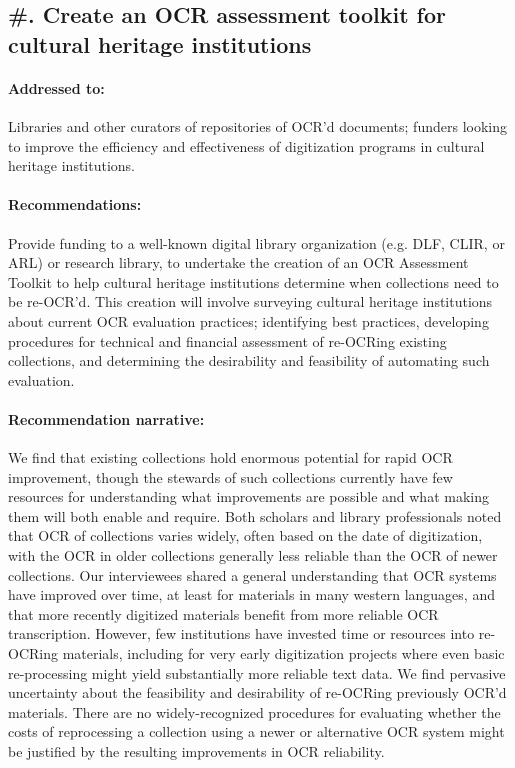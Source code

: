 \documentclass[twoside,11pt]{report}
\newcounter{reccounter}
\renewcommand{\thereccounter}{\arabic{reccounter}}
\newcommand{\recommend}[2]{\refstepcounter{reccounter}%
  \label{rec:#1}%
  \subsection{\#\thereccounter. #2}%
  \label{sec:rec-#1}}
\begin{document}
\recommend{assessment}{Create an OCR assessment toolkit for cultural heritage institutions}

\paragraph{Addressed to:} Libraries and other curators of repositories of OCR'd documents; funders looking to improve the efficiency and effectiveness of digitization programs in cultural heritage institutions.

\paragraph{Recommendations:} Provide funding to a well-known digital library organization (e.g. DLF, CLIR, or ARL) or research library, to undertake the creation of an OCR Assessment Toolkit to help cultural heritage institutions determine when collections need to be re-OCR'd. This creation will involve surveying cultural heritage institutions about current OCR evaluation practices; identifying best practices, developing procedures for technical and financial assessment of re-OCRing existing collections, and determining the desirability and feasibility of automating such evaluation.

\paragraph{Recommendation narrative:}

We find that existing collections hold enormous potential for rapid OCR improvement, though the stewards of such collections currently have few resources for understanding what improvements are possible and what making them will both enable and require. Both scholars and library professionals noted that OCR of collections varies widely, often based on the date of digitization, with the OCR in older collections generally less reliable than the OCR of newer collections. Our interviewees shared a general understanding that OCR systems have improved over time, at least for materials in many western languages, and that more recently digitized materials benefit from more reliable OCR transcription. However, few institutions have invested time or resources into re-OCRing materials, including for very early digitization projects where even basic re-processing might yield substantially more reliable text data. We find pervasive uncertainty about the feasibility and desirability of re-OCRing previously OCR'd materials. There are no widely-recognized procedures for evaluating whether the costs of reprocessing a collection using a newer or alternative OCR system might be justified by the resulting improvements in OCR reliability.
\end{document}

